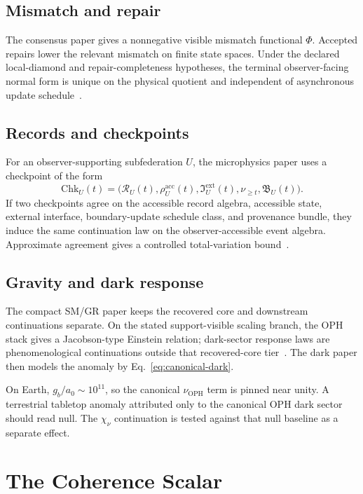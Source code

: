 \documentclass[11pt]{article}
\numberwithin{equation}{section}
\theoremstyle{remark}
\newcommand{\chinu}{\chi_\nu}
\newcommand{\nuoph}{\nu_{\mathrm{OPH}}}
\newcommand{\Ralg}{\mathcal R}
\begin{document}
\subsection{Mismatch and repair}

The consensus paper gives a nonnegative visible mismatch functional \(\Phi\).
Accepted repairs lower the relevant mismatch on finite state spaces. Under the
declared local-diamond and repair-completeness hypotheses, the terminal
observer-facing normal form is unique on the physical quotient and independent
of asynchronous update schedule~\cite{oph-consensus}.

\subsection{Records and checkpoints}

For an observer-supporting subfederation \(U\), the microphysics paper uses a
checkpoint of the form
\begin{equation}
\mathrm{Chk}_U(t)=
\bigl(
\Ralg_U(t),
\rho_U^{\mathrm{acc}}(t),
\mathfrak I_U^{\mathrm{ext}}(t),
\nu_{\ge t},
\mathfrak B_U(t)
\bigr).
\end{equation}
If two checkpoints agree on the accessible record algebra, accessible state,
external interface, boundary-update schedule class, and provenance bundle, they
induce the same continuation law on the observer-accessible event algebra. Approximate
agreement gives a controlled total-variation bound~\cite{oph-micro}.

\subsection{Gravity and dark response}

The compact SM/GR paper keeps the recovered core and downstream continuations
separate. On the stated support-visible scaling branch, the OPH stack gives a
Jacobson-type Einstein relation; dark-sector response laws are phenomenological
continuations outside that recovered-core tier~\cite{oph-compact}.
The dark paper then models the anomaly by Eq.~\eqref{eq:canonical-dark}.

On Earth, \(g_b/a_0\sim 10^{11}\), so the canonical \(\nuoph\) term is pinned
near unity. A terrestrial tabletop anomaly attributed only to the canonical OPH
dark sector should read null. The \(\chinu\) continuation is tested against
that null baseline as a separate effect.

\section{The Coherence Scalar}
\end{document}

